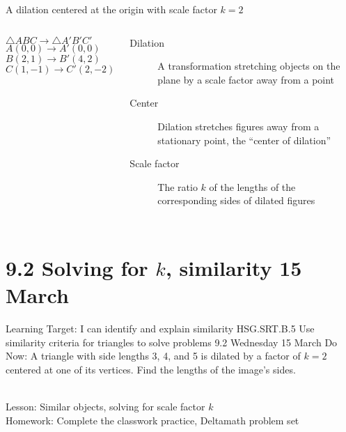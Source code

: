 \documentclass[onlytextwidth, aspectratio=169]{beamer}
\begin{document}
\begin{frame}{A dilation centered at the origin with scale factor $k=2$}
  \begin{columns}
    $\triangle ABC \rightarrow \triangle A'B'C'$\\[0.2cm]
    $A(0,0) \rightarrow A'(0,0)$\\
    $B(2,1) \rightarrow B'(4,2)$\\
    $C(1,-1) \rightarrow C'(2,-2)$ \vspace{0.3cm}
      \begin{description}
        \item[Dilation] A transformation stretching objects on the plane by a scale factor away from a point
        \item[Center] Dilation stretches figures away from a stationary point, the ``center of dilation''
        \item[Scale factor] The ratio $k$ of the lengths of the corresponding sides of dilated figures
      \end{description}
    \begin{flushright}
    \end{flushright}
  \end{columns}
\end{frame}

\section{9.2 Solving for $k$, similarity \hfill 15 March \,}
\begin{frame}{Learning Target: I can identify and explain similarity}
  {HSG.SRT.B.5 Use similarity criteria for triangles to solve problems \hfill \alert{9.2 Wednesday 15 March}}
    Do Now: A triangle with side lengths 3, 4, and 5 is dilated by a factor of $k=2$ centered at one of its vertices. Find the lengths of the image's sides. \\[0.5cm]
     \\[0.5cm]
    Lesson: Similar objects, solving for scale factor $k$ \\[0.5cm]
    Homework: Complete the classwork practice, Deltamath problem set \\[0.5cm]
\end{frame}
\end{document}
